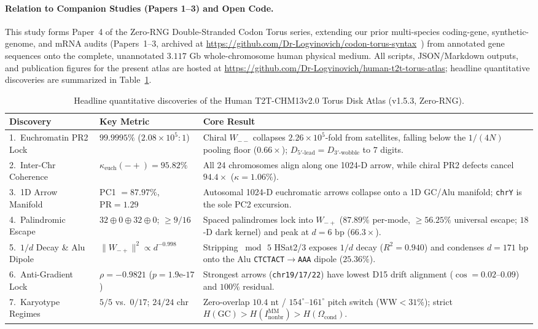 \documentclass[11pt,a4paper]{article}
\newcommand{\Wmp}{W_{-+}}
\newcommand{\Wmm}{W_{--}}
\newcommand{\Inb}{I_{\mathrm{nonbr}}^{\mathrm{MM}}}
\begin{document}
\paragraph{Relation to Companion Studies (Papers 1--3) and Open Code.}
This study forms Paper~4 of the Zero-RNG Double-Stranded Codon Torus series, extending our prior multi-species coding-gene, synthetic-genome, and mRNA audits (Papers~1--3, archived at \url{https://github.com/Dr-Logvinovich/codon-torus-syntax}~\cite{Logvinovich2026,Logvinovich2026b}) from annotated gene sequences onto the complete, unannotated $3.117\text{ Gb}$ whole-chromosome human physical medium. All scripts, JSON/Markdown outputs, and publication figures for the present atlas are hosted at \url{https://github.com/Dr-Logvinovich/human-t2t-torus-atlas}; headline quantitative discoveries are summarized in Table~\ref{tab:headline}.

\begin{table}[htbp]
\centering
\caption{Headline quantitative discoveries of the Human T2T-CHM13v2.0 Torus Disk Atlas (v1.5.3, Zero-RNG).}
\label{tab:headline}
\scriptsize
\begin{tabularx}{\textwidth}{@{}llX@{}}
\toprule
\textbf{Discovery} & \textbf{Key Metric} & \textbf{Core Result} \\
\midrule
1.\ Euchromatin PR2 Lock & $99.9995\%$ ($2.08\times 10^5\!:\!1$) & Chiral $\Wmm$ collapses $2.26\times 10^5$-fold from satellites, falling below the $1/(4N)$ pooling floor ($0.66\times$); $D_{5'\text{-lead}}=D_{3'\text{-wobble}}$ to $7$ digits. \\
2.\ Inter-Chr Coherence & $\kappa_{\mathrm{euch}}(-+)=95.82\%$ & All 24 chromosomes align along one 1024-D arrow, while chiral PR2 defects cancel $94.4\times$ ($\kappa=1.06\%$). \\
3.\ 1D Arrow Manifold & PC1 $=87.97\%$, $\mathrm{PR}=1.29$ & Autosomal 1024-D euchromatic arrows collapse onto a 1D GC/Alu manifold; \texttt{chrY} is the sole PC2 excursion. \\
4.\ Palindromic Escape & $32\oplus 0\oplus 32\oplus 0$; $\ge 9/16$ & Spaced palindromes lock into $\Wmp$ ($87.89\%$ per-mode, $\ge 56.25\%$ universal escape; $18$-D dark kernel) and peak at $d=6\text{ bp}$ ($66.3\times$). \\
5.\ $1/d$ Decay \& Alu Dipole & $\|\Wmp\|^2\!\propto\! d^{-0.998}$ & Stripping $\bmod\,5$ HSat2/3 exposes $1/d$ decay ($R^2=0.940$) and condenses $d=171\text{ bp}$ onto the Alu \texttt{CTCTACT}$\to$\texttt{AAA} dipole ($25.36\%$). \\
6.\ Anti-Gradient Lock & $\rho=-0.9821$ ($p=1.9\text{e-}17$) & Strongest arrows (\texttt{chr19/17/22}) have lowest D15 drift alignment ($\cos=0.02\text{--}0.09$) and $100\%$ residual. \\
7.\ Karyotype Regimes & $5/5$ vs.\ $0/17$; $24/24$ chr & Zero-overlap $10.4\text{ nt}$ / $154^\circ\text{--}161^\circ$ pitch switch ($\mathrm{WW}<31\%$); strict $H(\mathrm{GC})>H(\Inb)>H(\Omega_{\mathrm{cond}})$. \\
\bottomrule
\end{tabularx}
\end{table}
\end{document}
